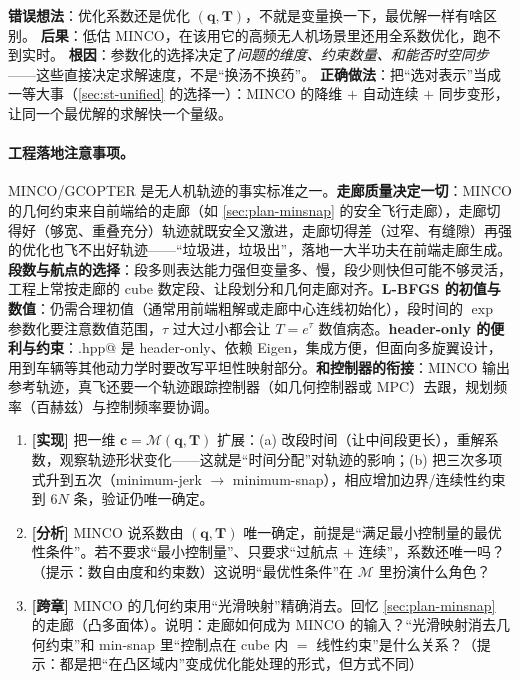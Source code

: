 \begin{pitfall}
\textbf{错误想法}：优化系数还是优化 $(\mathbf q,\mathbf T)$，不就是变量换一下，最优解一样有啥区别。\;
\textbf{后果}：低估 MINCO，在该用它的高频无人机场景里还用全系数优化，跑不到实时。\;
\textbf{根因}：参数化的选择决定了\emph{问题的维度、约束数量、和能否时空同步}——这些直接决定求解速度，不是“换汤不换药”。\;
\textbf{正确做法}：把“选对表示”当成一等大事（\cref{sec:st-unified} 的选择一）：MINCO 的降维 $+$ 自动连续 $+$ 同步变形，让同一个最优解的求解快一个量级。
\end{pitfall}

\paragraph{工程落地注意事项。}
MINCO/GCOPTER 是无人机轨迹的事实标准之一。\textbf{走廊质量决定一切}：MINCO 的几何约束来自前端给的走廊（如 \cref{sec:plan-minsnap} 的安全飞行走廊），走廊切得好（够宽、重叠充分）轨迹就既安全又激进，走廊切得差（过窄、有缝隙）再强的优化也飞不出好轨迹——“垃圾进，垃圾出”，落地一大半功夫在前端走廊生成。\textbf{段数与航点的选择}：段多则表达能力强但变量多、慢，段少则快但可能不够灵活，工程上常按走廊的 cube 数定段、让段划分和几何走廊对齐。\textbf{L-BFGS 的初值与数值}：仍需合理初值（通常用前端粗解或走廊中心连线初始化），段时间的 $\exp$ 参数化要注意数值范围，$\tau$ 过大过小都会让 $T=e^\tau$ 数值病态。\textbf{header-only 的便利与约束}：\verb@minco.hpp@ 是 header-only、依赖 Eigen，集成方便，但面向多旋翼设计，用到车辆等其他动力学时要改写平坦性映射部分。\textbf{和控制器的衔接}：MINCO 输出参考轨迹，真飞还要一个轨迹跟踪控制器（如几何控制器或 MPC）去跟，规划频率（百赫兹）与控制频率要协调。

\begin{practice}
\begin{enumerate}
  \item \textbf{[实现]} 把一维 $\mathbf c=\mathcal M(\mathbf q,\mathbf T)$ 扩展：(a) 改段时间（让中间段更长），重解系数，观察轨迹形状变化——这就是“时间分配”对轨迹的影响；(b) 把三次多项式升到五次（minimum-jerk $\to$ minimum-snap），相应增加边界/连续性约束到 $6N$ 条，验证仍唯一确定。
  \item \textbf{[分析]} MINCO 说系数由 $(\mathbf q,\mathbf T)$ 唯一确定，前提是“满足最小控制量的最优性条件”。若不要求“最小控制量”、只要求“过航点 + 连续”，系数还唯一吗？（提示：数自由度和约束数）这说明“最优性条件”在 $\mathcal M$ 里扮演什么角色？
  \item \textbf{[跨章]} MINCO 的几何约束用“光滑映射”精确消去。回忆 \cref{sec:plan-minsnap} 的走廊（凸多面体）。说明：走廊如何成为 MINCO 的输入？“光滑映射消去几何约束”和 min-snap 里“控制点在 cube 内 $=$ 线性约束”是什么关系？（提示：都是把“在凸区域内”变成优化能处理的形式，但方式不同）
\end{enumerate}
\end{practice}

